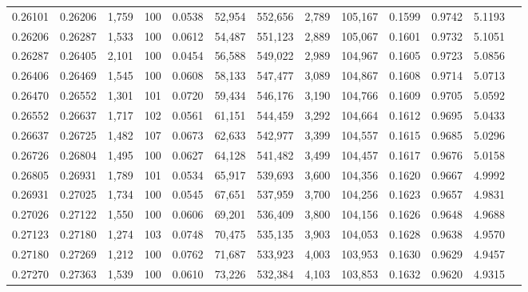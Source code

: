 \begin{tabular}{rrrrrrrrrrrrr}
0.26101 & 0.26206 & 1,759 & 100 &                                     0.0538 &  52,954 & 552,656 &   2,789 & 105,167 & 0.1599 & 0.9742 & 5.1193 \\
0.26206 & 0.26287 & 1,533 & 100 &                                     0.0612 &  54,487 & 551,123 &   2,889 & 105,067 & 0.1601 & 0.9732 & 5.1051 \\
0.26287 & 0.26405 & 2,101 & 100 &                                     0.0454 &  56,588 & 549,022 &   2,989 & 104,967 & 0.1605 & 0.9723 & 5.0856 \\
0.26406 & 0.26469 & 1,545 & 100 &                                     0.0608 &  58,133 & 547,477 &   3,089 & 104,867 & 0.1608 & 0.9714 & 5.0713 \\
0.26470 & 0.26552 & 1,301 & 101 &                                     0.0720 &  59,434 & 546,176 &   3,190 & 104,766 & 0.1609 & 0.9705 & 5.0592 \\
0.26552 & 0.26637 & 1,717 & 102 &                                     0.0561 &  61,151 & 544,459 &   3,292 & 104,664 & 0.1612 & 0.9695 & 5.0433 \\
0.26637 & 0.26725 & 1,482 & 107 &                                     0.0673 &  62,633 & 542,977 &   3,399 & 104,557 & 0.1615 & 0.9685 & 5.0296 \\
0.26726 & 0.26804 & 1,495 & 100 &                                     0.0627 &  64,128 & 541,482 &   3,499 & 104,457 & 0.1617 & 0.9676 & 5.0158 \\
0.26805 & 0.26931 & 1,789 & 101 &                                     0.0534 &  65,917 & 539,693 &   3,600 & 104,356 & 0.1620 & 0.9667 & 4.9992 \\
0.26931 & 0.27025 & 1,734 & 100 &                                     0.0545 &  67,651 & 537,959 &   3,700 & 104,256 & 0.1623 & 0.9657 & 4.9831 \\
0.27026 & 0.27122 & 1,550 & 100 &                                     0.0606 &  69,201 & 536,409 &   3,800 & 104,156 & 0.1626 & 0.9648 & 4.9688 \\
0.27123 & 0.27180 & 1,274 & 103 &                                     0.0748 &  70,475 & 535,135 &   3,903 & 104,053 & 0.1628 & 0.9638 & 4.9570 \\
0.27180 & 0.27269 & 1,212 & 100 &                                     0.0762 &  71,687 & 533,923 &   4,003 & 103,953 & 0.1630 & 0.9629 & 4.9457 \\
0.27270 & 0.27363 & 1,539 & 100 &                                     0.0610 &  73,226 & 532,384 &   4,103 & 103,853 & 0.1632 & 0.9620 & 4.9315 \\

\end{tabular}
